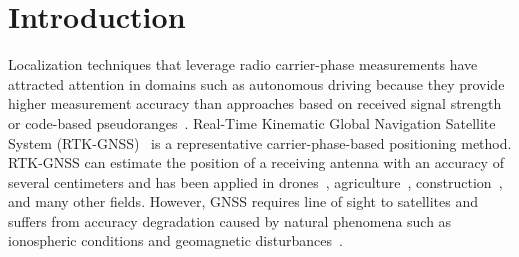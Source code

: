 \documentclass[conference]{IEEEtran}
\begin{document}
\section{Introduction}
Localization techniques that leverage radio carrier-phase measurements have attracted attention in domains such as autonomous driving because they provide higher measurement accuracy than approaches based on received signal strength or code-based pseudoranges~\cite{gnss_autonomou_vehicles}.
Real-Time Kinematic Global Navigation Satellite System (RTK-GNSS)~\cite{RTK-GNSS} is a representative carrier-phase-based positioning method.
RTK-GNSS can estimate the position of a receiving antenna with an accuracy of several centimeters and has been applied in drones~\cite{RTK-M300}, agriculture~\cite{RTK-Agriculture}, construction~\cite{six-dump}, and many other fields.
However, GNSS requires line of sight to satellites and suffers from accuracy degradation caused by natural phenomena such as ionospheric conditions and geomagnetic disturbances~\cite{gnss_error,STANKOV2007485}.
\end{document}
